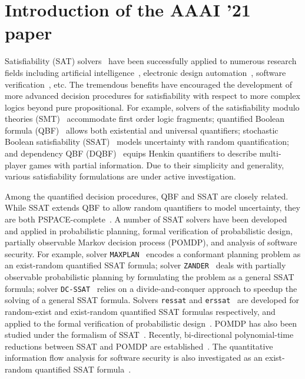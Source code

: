 \iffalse
    \section{Introduction of the AAAI '21 paper}
    Satisfiability (SAT) solvers~\cite{SATHandbook} have been successfully applied to numerous research fields including artificial intelligence~\cite{Nilsson2014,Russell2020}, electronic design automation~\cite{Marques2000,Wang2009}, software verification~\cite{Jhala2009, Berard2013}, etc.
    The tremendous benefits have encouraged the development of more advanced decision procedures for satisfiability with respect to more complex logics beyond pure propositional.
    For example, solvers of the satisfiability modulo theories (SMT)~\cite{Moura2011,HBMC-SMT} accommodate first order logic fragments; quantified Boolean formula (QBF)~\cite{Narizzano2006,SATHandbook-QBF} allows both existential and universal quantifiers; stochastic Boolean satisfiability (SSAT)~\cite{Littman2001,SATHandbook-SSAT} models uncertainty with random quantification; and dependency QBF (DQBF)~\cite{Balabanov2014,Scholl2018} equips Henkin quantifiers to describe multi-player games with partial information.
    Due to their simplicity and generality, various satisfiability formulations are under active investigation.

    Among the quantified decision procedures, QBF and SSAT are closely related.
    While SSAT extends QBF to allow random quantifiers to model uncertainty, they are both PSPACE-complete~\cite{Stockmeyer1973}.
    A number of SSAT solvers have been developed and applied in probabilistic planning, formal verification of probabilistic design, partially observable Markov decision process (POMDP), and analysis of software security.
    For example, solver \texttt{MAXPLAN}~\cite{Majercik1998} encodes a conformant planning problem as an exist-random quantified SSAT formula; solver \texttt{ZANDER}~\cite{Majercik2003} deals with partially observable probabilistic planning by formulating the problem as a general SSAT formula; solver \texttt{DC-SSAT}~\cite{Majercik2005} relies on a divide-and-conquer approach to speedup the solving of a general SSAT formula.
    Solvers \texttt{ressat} and \texttt{erssat}~\cite{LeeIJCAI17RESSAT,LeeIJCAI18ERSSAT} are developed for random-exist and exist-random quantified SSAT formulas respectively, and applied to the formal verification of probabilistic design~\cite{LeeTC18ProbDesign}.
    POMDP has also been studied under the formalism of SSAT~\cite{Majercik2004,Salmon2020}.
    Recently, bi-directional polynomial-time reductions between SSAT and POMDP are established~\cite{Salmon2020}.
    The quantitative information flow analysis for software security is also investigated as an exist-random quantified SSAT formula~\cite{Fremont2017}.

